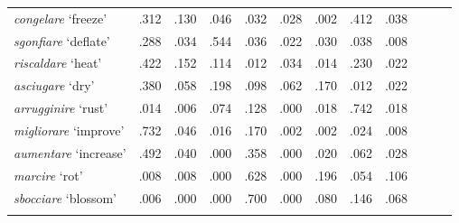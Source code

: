 \documentclass[output=paper,colorlinks,citecolor=brown
]{langscibook}
\begin{document}
\begin{table}[H]
\begin{tabular}{llllllllllll}
\textit{congelare} `freeze'     & .312     & .130  & .046                        & .032                                   & .028                                     & .002                  & .412                & .038  \\
\textit{sgonfiare} `deflate'    & .288     & .034   & .544                       & .036                                   & .022                                     & .030                  & .038                 & .008  \\
\textit{riscaldare} `heat'      & .422     & .152  & .114                       & .012                                   & .034                                     & .014                  & .230                & .022  \\
\textit{asciugare} `dry'        & .380     & .058   & .198                       & .098                                   & .062                                     & .170                 & .012                 & .022  \\
\textit{arrugginire} `rust'     & .014      & .006   & .074                        & .128                                  & .000                                     & .018                  & .742                & .018  \\
\textit{migliorare} `improve'   & .732     & .046   & .016                        & .170                                  & .002                                     & .002                  & .024                 & .008  \\
\textit{aumentare} `increase'   & .492     & .040   & .000                        & .358                                  & .000                                     & .020                  & .062                 & .028  \\
\textit{marcire} `rot'          & .008      & .008   & .000                        & .628                                  & .000                                     & .196                 & .054                 & .106 \\
\textit{sbocciare} `blossom'    & .006      & .000   & .000                        & .700                                  & .000                                     & .080                  & .146                & .068  \\
\lspbottomrule
\end{tabular}
\end{table}
 
 
\printbibliography[heading=subbibliography,notkeyword=this]
\end{document}

